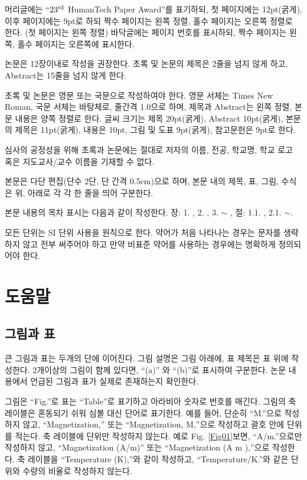 \documentclass{fullpaper_hutech}
\begin{document}
머리글에는 ``$23^{\rm rd}$ HumanTech Paper Award''를 표기하되, 첫 페이지에는 12pt(굵게), 이후 페이지에는 9pt로 하되 짝수 페이지는 왼쪽 정렬, 홀수 페이지는 오른쪽 정렬로 한다. (첫 페이지는 왼쪽 정렬) 바닥글에는 페이지 번호를 표시하되, 짝수 페이지는 왼쪽, 홀수 페이지는 오른쪽에 표시한다.

논문은 12장이내로 작성을 권장한다. 초록 및 논문의 제목은 2줄을 넘지 않게 하고, Abstract는 15줄을 넘지 않게 한다.

초록 및 논문은 영문 또는 국문으로 작성하여야 한다. 영문 서체는 Times New Roman, 국문 서체는 바탕체로, 줄간격 1.0으로 하며, 제목과 Abstract는 왼쪽 정렬, 본문 내용은 양쪽 정렬로 한다. 글씨 크기는 제목 20pt(굵게), Abstract 10pt(굵게), 본문의 제목은 11pt(굵게), 내용은 10pt, 그림 및 도표 9pt(굵게), 참고문헌은 9pt로 한다. 

심사의 공정성을 위해 초록과 논문에는 절대로 저자의 이름, 전공, 학교명, 학교 로고 혹은 지도교사/교수 이름을 기재할 수 없다.

본문은 다단 편집(단수 2단, 단 간격 0.5cm)으로 하며, 본문 내의 제목, 표, 그림, 수식은 위, 아래로 각 각 한 줄을 띄어 구분한다.

본문 내용의 목차 표시는 다음과 같이 작성한다. 장: 1. , 2. , 3. $ \sim $ , 절: 1.1. , 2.1. $ \sim $.

모든 단위는 SI 단위 사용을 원칙으로 한다. 약어가 처음 나타나는 경우는 문자를 생략하지 않고 전부 써주어야 하고 만약 비표준 약어를 사용하는 경우에는 명확하게 정의되어야 한다.

\section{도움말}

\subsection{그림과 표}

큰 그림과 표는 두개의 단에 이어진다. 그림 설명은 그림 아래에, 표 제목은 표 위에 작성한다. 2개이상의 그림이 함께 있다면, ``(a)'' 와 ``(b)''로 표시하여 구분한다. 논문 내용에서 언급된 그림과 표가 실제로 존재하는지 확인한다. 

그림은 ``Fig.''로 표는 ``Table''로 표기하고 아라비아 숫자로 번호를 매긴다. 
그림의 축 레이블은 혼동되기 쉬워 심볼 대신 단어로 표기한다. 예를 들어, 단순히 ``M.''으로 작성하지 않고, ``Magnetization,'' 또는 ``Magnetization, M,''으로 작성하고 괄호 안에 단위를 적는다. 축 레이블에 단위만 작성하지 않는다. 예로 Fig. \ref{Fig01}\를 보면, ``A/m.''으로만 작성하지 않고, ``Magnetization (A/m)'' 또는 ``Magnetization (A m ),''으로 작성한다. 축 레이블을 ``Temperature (K),''와 같이 작성하고, ``Temperature/K.''와 같은 단위와 수량의 비율로 작성하지 않는다. 
\end{document}
